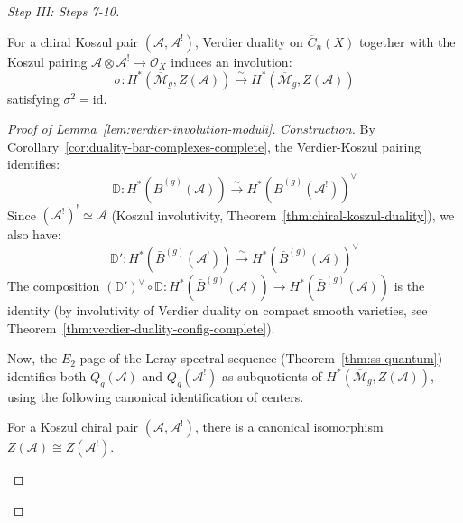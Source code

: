 \begin{proof}[Step III: Steps 7-10]
\begin{lemma}
\label{lem:verdier-involution-moduli}
For a chiral Koszul pair $(\mathcal{A}, \mathcal{A}^!)$, Verdier duality on
$\overline{C}_n(X)$ together with the Koszul pairing $\mathcal{A} \otimes
\mathcal{A}^! \to \mathcal{O}_X$ induces an involution:
\begin{equation}
\sigma: H^*(\overline{\mathcal{M}}_g, Z(\mathcal{A})) \xrightarrow{\sim}
H^*(\overline{\mathcal{M}}_g, Z(\mathcal{A}))
\end{equation}
satisfying $\sigma^2 = \mathrm{id}$.
\end{lemma}

\begin{proof}[Proof of Lemma~\ref{lem:verdier-involution-moduli}]
\emph{Construction.}
By Corollary~\ref{cor:duality-bar-complexes-complete}, the Verdier-Koszul pairing
identifies:
\begin{equation}
\mathbb{D}: H^*(\bar{B}^{(g)}(\mathcal{A})) \xrightarrow{\sim}
H^*(\bar{B}^{(g)}(\mathcal{A}^!))^\vee
\end{equation}
Since $(\mathcal{A}^!)^! \simeq \mathcal{A}$ (Koszul involutivity,
Theorem~\ref{thm:chiral-koszul-duality}), we also have:
\begin{equation}
\mathbb{D}': H^*(\bar{B}^{(g)}(\mathcal{A}^!)) \xrightarrow{\sim}
H^*(\bar{B}^{(g)}(\mathcal{A}))^\vee
\end{equation}
The composition $(\mathbb{D}')^\vee \circ \mathbb{D}: H^*(\bar{B}^{(g)}(\mathcal{A}))
\to H^*(\bar{B}^{(g)}(\mathcal{A}))$ is the identity (by involutivity of Verdier
duality on compact smooth varieties, see Theorem~\ref{thm:verdier-duality-config-complete}).

Now, the $E_2$ page of the Leray spectral sequence
(Theorem~\ref{thm:ss-quantum}) identifies both $Q_g(\mathcal{A})$ and
$Q_g(\mathcal{A}^!)$ as subquotients of $H^*(\overline{\mathcal{M}}_g,
Z(\mathcal{A}))$, using the following canonical identification of centers.

\begin{lemma}
\label{sublem:center-isomorphism}
For a Koszul chiral pair $(\mathcal{A}, \mathcal{A}^!)$, there is a canonical
isomorphism $Z(\mathcal{A}) \cong Z(\mathcal{A}^!)$.
\end{lemma}


\end{proof}
\end{proof}
